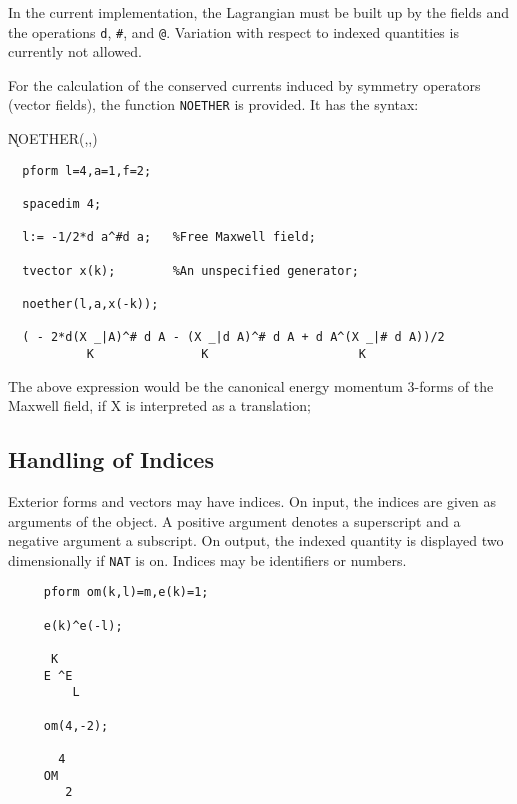 In the current implementation, the Lagrangian must be built up by the
fields and the operations {\tt d}, {\tt \#}, and {\tt @}. Variation
with respect to indexed quantities is currently not allowed.

For the calculation of the conserved currents induced by symmetry
operators (vector fields), the function {\tt NOETHER}\label{NOETHER}
is provided.  It has the syntax:

\hspace*{2em}
\k{NOETHER}(,,)

\example{}
\begin{verbatim}
  pform l=4,a=1,f=2;

  spacedim 4;

  l:= -1/2*d a^#d a;   %Free Maxwell field;

  tvector x(k);        %An unspecified generator;

  noether(l,a,x(-k));

  ( - 2*d(X _|A)^# d A - (X _|d A)^# d A + d A^(X _|# d A))/2
           K               K                     K
\end{verbatim}

The above expression would be the canonical energy
momentum 3-forms of the Maxwell field, if X is interpreted
as a translation;



\subsection{Handling of Indices}
Exterior forms and vectors may have indices.  On input, the indices
are given as arguments of the object.  A positive argument denotes a
superscript and a negative argument a subscript.  On output, the
indexed quantity is displayed two dimensionally if {\tt NAT} is on.
Indices may be identifiers or numbers.  

\example{}

\begin{verbatim}
     pform om(k,l)=m,e(k)=1;

     e(k)^e(-l);

      K
     E ^E
         L

     om(4,-2);

       4
     OM
        2
\end{verbatim}

